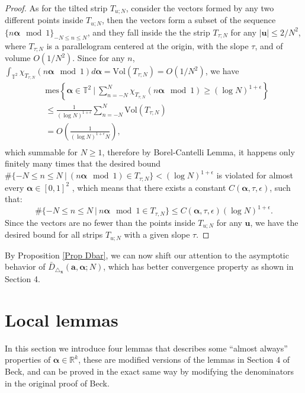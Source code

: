 \documentclass[11pt]{article}
\newcommand{\fc}{\frac}
\renewcommand{\l}{\left}
\renewcommand{\r}{\right}
\newcommand{\T}{\mathbb{T}}
\newcommand{\R}{\mathbb{R}}
\renewcommand{\a}{\alpha}
\newcommand{\e}{\epsilon}
\renewcommand{\(}{\left(}
\renewcommand{\)}{\right)}
\renewcommand{\bf}{\mathbf}
\newcommand{\bal}{\begin{aligned}}
\newcommand{\eal}{\end{aligned}}
\newcommand{\Dbar}{\bar{D}_{\triangle_{\bf{x}}} (\bm{a},\bm{\a}; N)}
\newcommand{\Vol}{\text{Vol}}
\newcommand{\bma}{\bm{\alpha}}
\newcommand{\<}{\langle}
\renewcommand{\>}{\rangle}
\begin{document}
\begin{proof}
As for the tilted strip $T_{u;N}$, consider the vectors formed by any two different points inside $T_{u;N}$, then the vectors form a subset of the sequence $\{n\bma\mod 1\}_{-N\le n\le N}$, and they fall inside the the strip $T_{\tau; N}$ for any $|\bf{u}|\le 2/N^2$, where $T_{\tau;N}$ is a parallelogram centered at the origin, with the slope $\tau$, and of volume $O(1/N^2)$. Since for any $n$, $\int_{\T^2} \chi_{T_{\tau;N}}( n\bm{\a} \mod 1) d\bm{\a} =\Vol (T_{\tau;N})=O(1/N^2)$, we have
$$
\bal
&\text{mes}\l\{\bm{\a}\in \T^2 \ \Big| \ \sum_{n=-N}^{N} \chi_{T_{\tau;N}}( n\bm{\a} \mod 1)\ge (\log N)^{1+\e}\r\}\\
&\le \fc{1}{(\log N)^{1+\e}} \sum_{n=-N}^{N} \Vol(T_{\tau;N})\\
&=O\l(\fc{1}{(\log N)^{1+\e} N}\r),\\
\eal
$$
which summable for $N\ge 1$, therefore by Borel-Cantelli Lemma, it happens only finitely many times that the desired bound $\#\{-N\le n\le N \ |\  (n\bma\mod 1)\in T_{\tau;N}\}< (\log N)^{1+\e}$ is violated for almost every $\bma\in [0,1]^2$ , which means that there exists a constant $C(\bm{\a}, \tau, \e)$, such that:
$$
\#\{-N\le n\le N \ |\  n\bm{\a} \mod 1 \in T_{\tau,N} \} \le C(\bm{\a}, \tau, \e)(\log N)^{1+\e}.
$$
Since the vectors are no fewer than the points inside $T_{u;N}$ for any $\bf{u}$, we have the desired bound for all strips $T_{u;N}$ with a given slope $\tau$.  
\end{proof}


By Proposition \ref{Prop Dbar}, we can now shift our attention to the asymptotic behavior of $\Dbar$, which has better convergence property as shown in Section 4.

\section{Local lemmas}
In this section we introduce four lemmas that describes some ``almost always'' properties of $\bm{\a}\in \R^k$, these are modified versions of the lemmas in Section 4 of Beck\cite{Beck}, and can be proved in the exact same way by modifying the denominators in the original proof of Beck.
\end{document}
